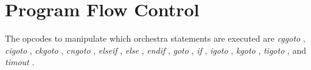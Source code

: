 \begin{comment}
\documentclass[10pt]{article}
\usepackage{fullpage, graphicx, url}
\setlength{\parskip}{1ex}
\setlength{\parindent}{0ex}
\title{Program Flow Control}



\begin{tabular}{ccc}
The Alternative Csound Reference Manual & & \\
Previous &Instrument Control &Next

\end{tabular}

\end{comment}
\section{Program Flow Control}


  The opcodes to manipulate which orchestra statements are executed are \emph{cggoto}
, \emph{cigoto}
, \emph{ckgoto}
, \emph{cngoto}
, \emph{elseif}
, \emph{else}
, \emph{endif}
, \emph{goto}
, \emph{if}
, \emph{igoto}
, \emph{kgoto}
, \emph{tigoto}
, and \emph{timout}
. 


\begin{comment}
\begin{tabular}{lcr}
Previous &Home &Next \\
Macros &Up &Real-time Performance Control

\end{tabular}



\end{comment}
